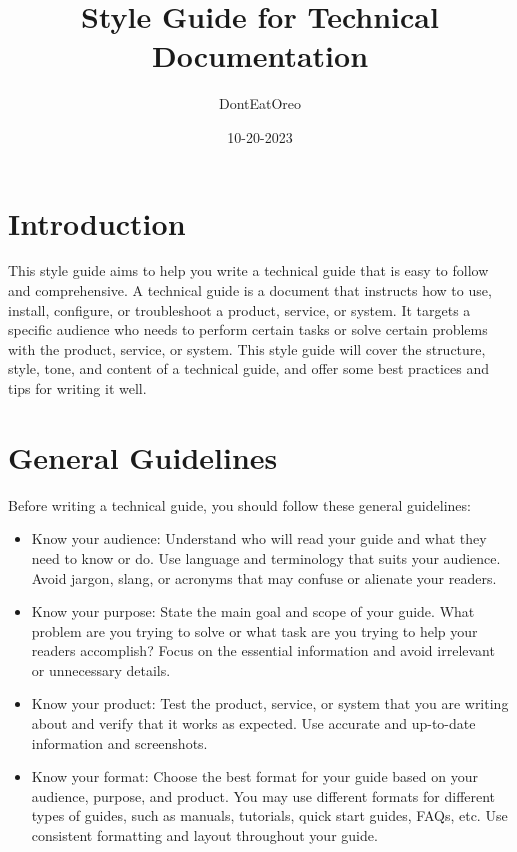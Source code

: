 \documentclass[12pt]{article}
\title{Style Guide for Technical Documentation}
\author{DontEatOreo}
\date{10-20-2023}
\begin{document}
\maketitle

\pagebreak

\tableofcontents

\pagebreak

\section{Introduction}

This style guide aims to help you write a technical guide that is easy to follow and comprehensive. A technical guide is a document that instructs how to use, install, configure, or troubleshoot a product, service, or system. It targets a specific audience who needs to perform certain tasks or solve certain problems with the product, service, or system. This style guide will cover the structure, style, tone, and content of a technical guide, and offer some best practices and tips for writing it well.

\section{General Guidelines}

Before writing a technical guide, you should follow these general guidelines:

\begin{itemize}
    \item Know your audience: Understand who will read your guide and what they need to know or do. Use language and terminology that suits your audience. Avoid jargon, slang, or acronyms that may confuse or alienate your readers.
    \item Know your purpose: State the main goal and scope of your guide. What problem are you trying to solve or what task are you trying to help your readers accomplish? Focus on the essential information and avoid irrelevant or unnecessary details.
    \item Know your product: Test the product, service, or system that you are writing about and verify that it works as expected. Use accurate and up-to-date information and screenshots.
    \item Know your format: Choose the best format for your guide based on your audience, purpose, and product. You may use different formats for different types of guides, such as manuals, tutorials, quick start guides, FAQs, etc. Use consistent formatting and layout throughout your guide.
\end{itemize}
\end{document}
